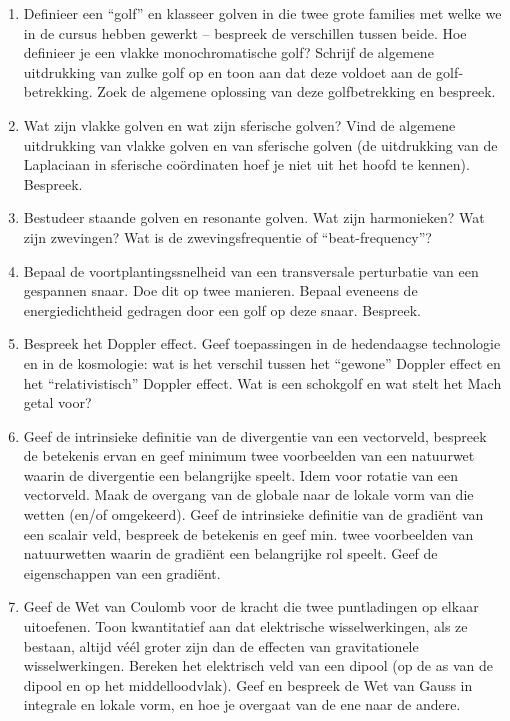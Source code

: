 \documentclass[12pt]{article}
\begin{document}
    \maketitle

    \begin{enumerate}
        \item Definieer een “golf” en klasseer golven in die twee grote families met welke we in de cursus hebben gewerkt – bespreek de verschillen tussen beide. Hoe definieer je een vlakke monochromatische golf? Schrijf de algemene uitdrukking van zulke golf op en toon aan dat deze voldoet aan de golf­betrekking. Zoek de algemene oplossing van deze golfbetrekking en bespreek.
        \item Wat zijn vlakke golven en wat zijn sferische golven? Vind de algemene uitdrukking van vlakke golven en van sferische golven (de uitdrukking van de Laplaciaan in sferische coördinaten hoef je niet uit het hoofd te kennen). Bespreek.
        \item Bestudeer staande golven en resonante golven.  Wat zijn harmonieken? Wat zijn zwevingen? Wat is de zwevingsfrequentie of “beat-frequency”?
        \item Bepaal de voortplantingssnelheid van een transversale perturbatie van een gespannen snaar. Doe dit op twee manieren. Bepaal eveneens de energiedichtheid gedragen door een golf op deze snaar. Bespreek.
        \item Bespreek het Doppler effect. Geef toepassingen in de hedendaagse technologie en in de kosmologie: wat is het verschil tussen het “gewone” Doppler effect en het “relativistisch” Doppler effect. Wat is een schokgolf en wat stelt het Mach getal voor?
        \item Geef de intrinsieke definitie van de divergentie van een vectorveld, bespreek de betekenis ervan en geef minimum twee voorbeelden van een natuurwet waarin de divergentie een belangrijke speelt. Idem voor rotatie van een vectorveld. Maak de overgang van de globale naar de lokale vorm van die wetten (en/of omgekeerd). Geef de intrinsieke definitie van de gradiënt van een scalair veld, bespreek de betekenis en geef min. twee voorbeelden van natuurwetten waarin de gradiënt een belangrijke rol speelt. Geef de eigenschappen van een gradiënt.
        \item Geef de Wet van Coulomb voor de kracht die twee puntladingen op elkaar uitoefenen. Toon kwantitatief aan dat elektrische wisselwerkingen, als ze bestaan, altijd véél groter zijn dan de effecten van gravitationele wisselwerkingen. Bereken het elektrisch veld van een dipool (op de as van de dipool en op het middelloodvlak). Geef en bespreek de Wet van Gauss in integrale en lokale vorm, en hoe je overgaat van de ene naar de andere. 

\end{enumerate}
\end{document}
